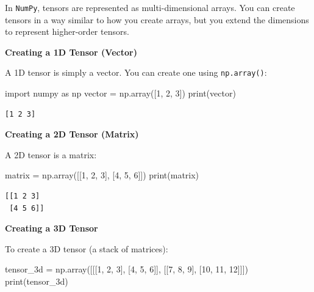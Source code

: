 \documentclass[
  letterpaper,
  DIV=11,
  numbers=noendperiod]{scrreprt}
\newenvironment{Shaded}{\begin{snugshade}}{\end{snugshade}}
\newcommand{\BuiltInTok}[1]{\textcolor[rgb]{0.00,0.23,0.31}{#1}}
\newcommand{\DecValTok}[1]{\textcolor[rgb]{0.68,0.00,0.00}{#1}}
\newcommand{\ImportTok}[1]{\textcolor[rgb]{0.00,0.46,0.62}{#1}}
\newcommand{\NormalTok}[1]{\textcolor[rgb]{0.00,0.23,0.31}{#1}}
\newcommand{\OperatorTok}[1]{\textcolor[rgb]{0.37,0.37,0.37}{#1}}
\theoremstyle{plain}
\theoremstyle{definition}
\theoremstyle{remark}
\begin{document}
In \texttt{NumPy}, tensors are represented as multi-dimensional arrays.
You can create tensors in a way similar to how you create arrays, but
you extend the dimensions to represent higher-order tensors.

\textbf{Creating a 1D Tensor (Vector)}

A 1D tensor is simply a vector. You can create one using
\texttt{np.array()}:

\begin{Shaded}
\begin{Highlighting}[]
\ImportTok{import}\NormalTok{ numpy }\ImportTok{as}\NormalTok{ np}
\NormalTok{vector }\OperatorTok{=}\NormalTok{ np.array([}\DecValTok{1}\NormalTok{, }\DecValTok{2}\NormalTok{, }\DecValTok{3}\NormalTok{])}
\BuiltInTok{print}\NormalTok{(vector)}
\end{Highlighting}
\end{Shaded}

\begin{verbatim}
[1 2 3]
\end{verbatim}

\textbf{Creating a 2D Tensor (Matrix)}

A 2D tensor is a matrix:

\begin{Shaded}
\begin{Highlighting}[]
\NormalTok{matrix }\OperatorTok{=}\NormalTok{ np.array([[}\DecValTok{1}\NormalTok{, }\DecValTok{2}\NormalTok{, }\DecValTok{3}\NormalTok{], [}\DecValTok{4}\NormalTok{, }\DecValTok{5}\NormalTok{, }\DecValTok{6}\NormalTok{]])}
\BuiltInTok{print}\NormalTok{(matrix)}
\end{Highlighting}
\end{Shaded}

\begin{verbatim}
[[1 2 3]
 [4 5 6]]
\end{verbatim}

\textbf{Creating a 3D Tensor}

To create a 3D tensor (a stack of matrices):

\begin{Shaded}
\begin{Highlighting}[]
\NormalTok{tensor\_3d }\OperatorTok{=}\NormalTok{ np.array([[[}\DecValTok{1}\NormalTok{, }\DecValTok{2}\NormalTok{, }\DecValTok{3}\NormalTok{], [}\DecValTok{4}\NormalTok{, }\DecValTok{5}\NormalTok{, }\DecValTok{6}\NormalTok{]], [[}\DecValTok{7}\NormalTok{, }\DecValTok{8}\NormalTok{, }\DecValTok{9}\NormalTok{], [}\DecValTok{10}\NormalTok{, }\DecValTok{11}\NormalTok{, }\DecValTok{12}\NormalTok{]]])}
\BuiltInTok{print}\NormalTok{(tensor\_3d)}
\end{Highlighting}
\end{Shaded}
\end{document}

